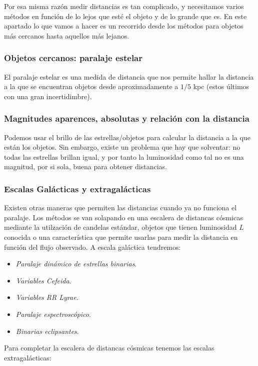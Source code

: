 Por esa misma razón medir distancias es tan complicado, y necesitamos varios métodos en función de lo lejos que esté el objeto y de lo grande que es. En este apartado lo que vamos a hacer es un recorrido desde los métodos para objetos más cercanos hasta aquellos más lejanos.

\subsubsection{Objetos cercanos: paralaje estelar}

El paralaje estelar es una medida de distancia que nos permite hallar la distancia a la que se encuentran objetos desde aproximadamente a $1/5$ kpc (estos últimos con una gran incertidimbre).

\subsubsection{Magnitudes aparences, absolutas y relación con la distancia}

Podemos usar el brillo de las estrellas/objetos para calcular la distancia a la que están los objetos. Sin embargo, existe un problema que hay que solventar: no todas las estrellas brillan igual, y por tanto la luminosidad como tal no es una magnitud, por si sola, buena para obtener distancias.


\subsubsection{Escalas Galácticas y extragalácticas}

Existen otras maneras que permiten las distancias cuando ya no funciona el paralaje. Los métodos se van solapando en una escalera de distancas cósmicas mediante la utilzación de candelas estándar, objetos que tienen luminosidad $L$ conocida o una característica que permite usarlas para medir la distancia en función del flujo observado. A escala galáctica tendremos:

\begin{itemize}
	\item \textit{Paralaje dinámico de estrellas binarias}.
	\item \textit{Variables Cefeida}.
	\item \textit{Variables RR Lyrae}.
	\item \textit{Paralaje espectroscópico}.
	\item \textit{Binarias eclipsantes}.
\end{itemize}
Para completar la escalera de distancas cósmicas tenemos las escalas extragalácticas:

